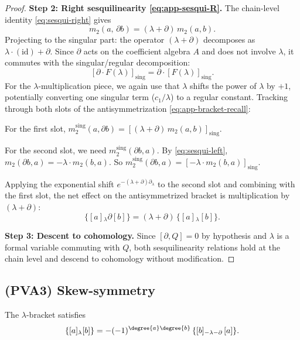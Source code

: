 \begin{proof}
\textbf{Step 2: Right sesquilinearity \eqref{eq:app-sesqui-R}.}
The chain-level identity \eqref{eq:sesqui-right} gives
\[
m_2(a,\, \partial b) = (\lambda + \partial)\,m_2(a,b).
\]
Projecting to the singular part: the operator $(\lambda + \partial)$ decomposes as $\lambda \cdot (\text{id}) + \partial$. Since $\partial$ acts on the coefficient algebra $A$ and does not involve $\lambda$, it commutes with the singular/regular decomposition:
\[
[\partial \cdot F(\lambda)]_{\mathrm{sing}} = \partial \cdot [F(\lambda)]_{\mathrm{sing}}.
\]
For the $\lambda$-multiplication piece, we again use that $\lambda$ shifts the power of $\lambda$ by $+1$, potentially converting one singular term ($c_1/\lambda$) to a regular constant. Tracking through both slots of the antisymmetrization \eqref{eq:app-bracket-recall}:

For the first slot, $m_2^{\mathrm{sing}}(a, \partial b) = [(\lambda + \partial)\,m_2(a,b)]_{\mathrm{sing}}$.

For the second slot, we need $m_2^{\mathrm{sing}}(\partial b, a)$. By \eqref{eq:sesqui-left}, $m_2(\partial b, a) = -\lambda \cdot m_2(b,a)$. So $m_2^{\mathrm{sing}}(\partial b, a) = [-\lambda \cdot m_2(b,a)]_{\mathrm{sing}}$.

Applying the exponential shift $e^{-(\lambda+\partial)\partial_\lambda}$ to the second slot and combining with the first slot, the net effect on the antisymmetrized bracket is multiplication by $(\lambda + \partial)$:
\[
\{[a]{}_\lambda \partial [b]\} = (\lambda + \partial)\,\{[a]{}_\lambda [b]\}.
\]

\textbf{Step 3: Descent to cohomology.}
Since $[\partial, Q] = 0$ by hypothesis and $\lambda$ is a formal variable commuting with $Q$, both sesquilinearity relations hold at the chain level and descend to cohomology without modification.
\end{proof}

\subsection{(PVA3) Skew-symmetry}

\begin{proposition}
\label{prop:app-skew}
The $\lambda$-bracket satisfies
\begin{equation}
\label{eq:app-skew}
\{[a]{}_\lambda [b]\}
= -(-1)^{\degree{a}\degree{b}}\,
\{[b]{}_{-\lambda-\partial}\,[a]\}.
\end{equation}
\end{proposition}

